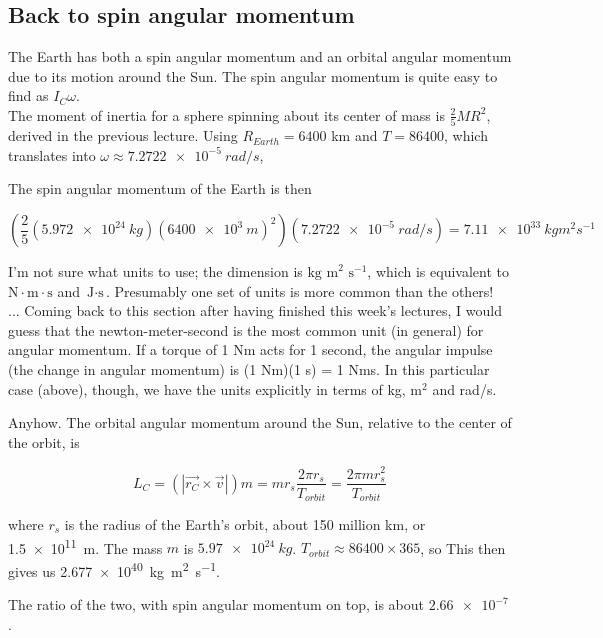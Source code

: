 \subsection{Back to spin angular momentum}

The Earth has both a spin angular momentum and an orbital angular momentum due to its motion around the Sun. The spin angular momentum is quite easy to find as $I_C \omega$.\\
The moment of inertia for a sphere spinning about its center of mass is $\displaystyle \frac{2}{5} M R^2$, derived in the previous lecture. Using $R_{Earth} = 6400$ km and $T = 86400$, which translates into $\omega \approx \SI{7.2722e-5}{rad/s}$, 

The spin angular momentum of the Earth is then

\begin{equation}
\left(\frac{2}{5} (\SI{5.972e24}{kg}) (\SI{6400e3}{m})^2\right) (\SI{7.2722e-5}{rad/s}) = \SI{7.11e33}{kg m^2 s^{-1}}
\end{equation}

I'm not sure what units to use; the dimension is $\text{kg m}^2 \text{ s}^{-1}$, which is equivalent to $\text{N}\cdot\text{m} \cdot \text{s}$ and $\text{J} \cdot \text{s}$. Presumably one set of units is more common than the others!\\
... Coming back to this section after having finished this week's lectures, I would guess that the newton-meter-second is the most common unit (in general) for angular momentum. If a torque of 1 Nm acts for 1 second, the angular impulse (the change in angular momentum) is (1 Nm)(1 s) = 1 Nms. In this particular case (above), though, we have the units explicitly in terms of kg, $\text{m}^2$ and rad/s.

Anyhow.
The orbital angular momentum around the Sun, relative to the center of the orbit, is

\begin{equation}
L_C = (|\vec{r_C} \times \vec{v}|) m = m r_s \frac{2 \pi r_s}{T_{orbit}} = \frac{2 \pi m r_s^2}{T_{orbit}}
\end{equation}

where $r_s$ is the radius of the Earth's orbit, about 150 million km, or \SI{1.5e11}{m}. The mass $m$ is $\SI{5.97e24}{kg}$. $T_{orbit} \approx 86400 \times 365$, so
This then gives us \SI{2.677e40}{kg m^2 s^{-1}}.

The ratio of the two, with spin angular momentum on top, is about $\num{2.66e-7}$.

